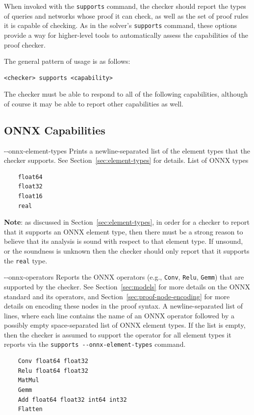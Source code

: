 When invoked with the \texttt{supports} command, the checker should report the types of queries and networks whose proof it can check, as well as the set of proof rules it is capable of checking. As in the solver's \texttt{supports} command, these options provide a way for higher-level tools to automatically assess the capabilities of the proof checker.

The general pattern of usage is as follows:
\begin{lstlisting}[style=bash]
	<checker> supports <capability>
\end{lstlisting}
The checker must be able to respond to all of the following capabilities, although of course it may be able to report other capabilities as well.

\subsection{ONNX Capabilities}

\clOutputOption
{-{}-onnx-element-types}
{Prints a newline-separated list of the element types that the checker supports. See Section~\ref{sec:element-types} for details.}
{List of ONNX types}
\begin{lstlisting}[style=bash]
	%*\exampleChecker* supports --onnx-element-types
	float64
	float32
	float16
	real
\end{lstlisting}
\textbf{Note}: as discussed in Section~\ref{sec:element-types}, in order for a checker to report that it supports an ONNX element type, then there must be a strong reason to believe that its analysis is sound with respect to that element type. If unsound, or the soundness is unknown then the checker should only report that it supports the \texttt{real} type.

\clOutputOption
{-{}-onnx-operators}
{Reports the ONNX operators (e.g., \texttt{Conv}, \texttt{Relu}, \texttt{Gemm}) that are supported by the checker. See Section~\ref{sec:models} for more details on the ONNX standard and its operators, and Section~\ref{sec:proof-node-encoding} for more details on encoding these nodes in the proof syntax.
}
{A newline-separated list of lines, where each line contains the name of an ONNX operator followed by a possibly empty space-separated list of ONNX element types.  If the list is empty, then the checker is assumed to support the operator for all element types it reports via the \texttt{supports -{}-onnx-element-types} command.
}
\begin{lstlisting}[style=bash]
	%*\exampleChecker* supports --onnx-operators
	Conv float64 float32
	Relu float64 float32
	MatMul
	Gemm
	Add float64 float32 int64 int32
	Flatten
\end{lstlisting}


